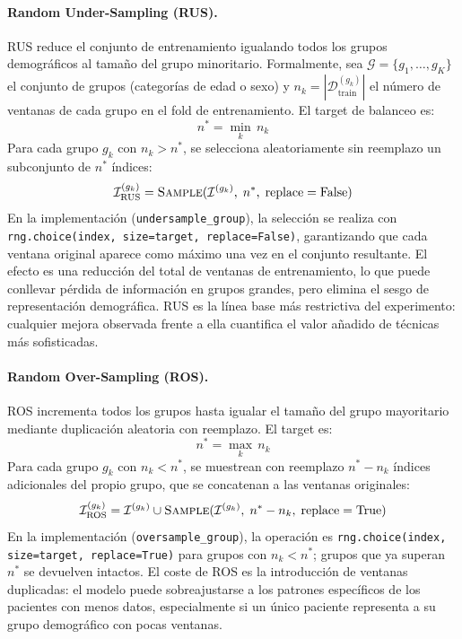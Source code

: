 \paragraph{Random Under-Sampling (RUS).}
RUS reduce el conjunto de entrenamiento igualando todos los grupos demográficos al tamaño del grupo minoritario. Formalmente, sea $\mathcal{G} = \{g_1, \ldots, g_K\}$ el conjunto de grupos (categorías de edad o sexo) y $n_k = |\mathcal{D}^{(g_k)}_\text{train}|$ el número de ventanas de cada grupo en el fold de entrenamiento. El target de balanceo es:
\begin{equation}
  n^* = \min_{k} \, n_k
  \label{eq:rus_target}
\end{equation}
Para cada grupo $g_k$ con $n_k > n^*$, se selecciona aleatoriamente sin reemplazo un subconjunto de $n^*$ índices:
\begin{equation}
  \mathcal{I}^{(g_k)}_\text{RUS} = \textsc{Sample}(\mathcal{I}^{(g_k)}, \; n^*, \; \text{replace}=\text{False})
  \label{eq:rus_sample}
\end{equation}
En la implementación (\texttt{undersample\_group}), la selección se realiza con \texttt{rng.choice(index, size=target, replace=False)}, garantizando que cada ventana original aparece como máximo una vez en el conjunto resultante. El efecto es una reducción del total de ventanas de entrenamiento, lo que puede conllevar pérdida de información en grupos grandes, pero elimina el sesgo de representación demográfica. RUS es la línea base más restrictiva del experimento: cualquier mejora observada frente a ella cuantifica el valor añadido de técnicas más sofisticadas.

\paragraph{Random Over-Sampling (ROS).}
ROS incrementa todos los grupos hasta igualar el tamaño del grupo mayoritario mediante duplicación aleatoria con reemplazo. El target es:
\begin{equation}
  n^* = \max_{k} \, n_k
  \label{eq:ros_target}
\end{equation}
Para cada grupo $g_k$ con $n_k < n^*$, se muestrean con reemplazo $n^* - n_k$ índices adicionales del propio grupo, que se concatenan a las ventanas originales:
\begin{equation}
  \mathcal{I}^{(g_k)}_\text{ROS} = \mathcal{I}^{(g_k)} \cup \textsc{Sample}(\mathcal{I}^{(g_k)}, \; n^* - n_k, \; \text{replace}=\text{True})
  \label{eq:ros_sample}
\end{equation}
En la implementación (\texttt{oversample\_group}), la operación es \texttt{rng.choice(index, size=target, replace=True)} para grupos con $n_k < n^*$; grupos que ya superan $n^*$ se devuelven intactos. El coste de ROS es la introducción de ventanas duplicadas: el modelo puede sobreajustarse a los patrones específicos de los pacientes con menos datos, especialmente si un único paciente representa a su grupo demográfico con pocas ventanas.

